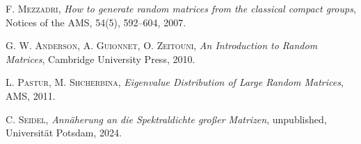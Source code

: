 \begin{thebibliography}{56}
    \textsc{F. Mezzadri},
    \textit{How to generate random matrices from the classical compact groups},
    Notices of the AMS, 54(5), 592--604,
    2007.

    \textsc{G. W. Anderson, A. Guionnet, O. Zeitouni},
    \textit{An Introduction to Random Matrices},
    Cambridge University Press,
    2010.

    \textsc{L. Pastur, M. Shcherbina},
    \textit{Eigenvalue Distribution of Large Random Matrices},
    AMS,
    2011.

    \textsc{C. Seidel},
    \textit{Annäherung an die Spektraldichte großer Matrizen},
    unpublished, Universität Potsdam, 2024.

\end{thebibliography}